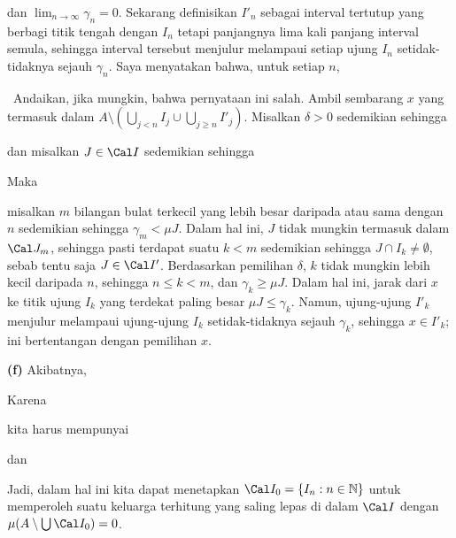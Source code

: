 {\noindent dan $\lim_{n\to\infty}\gamma_n=0$. Sekarang definisikan
$I'_n$ sebagai interval tertutup yang berbagi titik tengah dengan
$I_n$ tetapi panjangnya lima kali panjang interval semula, sehingga
interval tersebut menjulur melampaui setiap ujung $I_n$ setidak-tidaknya sejauh
$\gamma_n$. Saya menyatakan bahwa, untuk setiap $n$,


\noindent\Prf\Quer\ Andaikan, jika mungkin, bahwa pernyataan ini salah.
Ambil sembarang $x$ yang termasuk dalam
$A\setminus(\bigcup_{j<n}{I}_j\cup\bigcup_{j\ge n}I'_j)$. Misalkan
$\delta>0$ sedemikian sehingga



\noindent dan misalkan $J\in\Cal I$ sedemikian sehingga


\noindent Maka


\noindent misalkan $m$ bilangan bulat terkecil yang lebih besar daripada
atau sama dengan $n$ sedemikian sehingga $\gamma_m<\mu J$. Dalam hal ini,
$J$ tidak mungkin termasuk dalam $\Cal J_m$, sehingga pasti terdapat
suatu $k<m$ sedemikian sehingga $J\cap I_k\ne\emptyset$, sebab tentu saja
$J\in\Cal I'$. Berdasarkan pemilihan $\delta$, $k$ tidak mungkin lebih
kecil daripada $n$, sehingga $n\le k<m$, dan $\gamma_k\ge\mu J$. Dalam
hal ini, jarak dari $x$ ke titik ujung $I_k$ yang terdekat paling besar
$\mu J\le \gamma_k$. Namun, ujung-ujung $I'_k$ menjulur melampaui
ujung-ujung $I_k$ setidak-tidaknya sejauh $\gamma_k$, sehingga
$x\in I'_k$; ini bertentangan dengan pemilihan $x$. \Bang \Qed

\medskip

{\bf (f)} Akibatnya,


\noindent Karena


\noindent kita harus mempunyai


\noindent dan


Jadi, dalam hal ini kita dapat menetapkan
$\Cal I_0=\{I_n:n\in\Bbb N\}$ untuk memperoleh suatu keluarga terhitung
yang saling lepas di dalam $\Cal I$ dengan
$\mu(A\setminus\bigcup\Cal I_0)=0$.
}%

